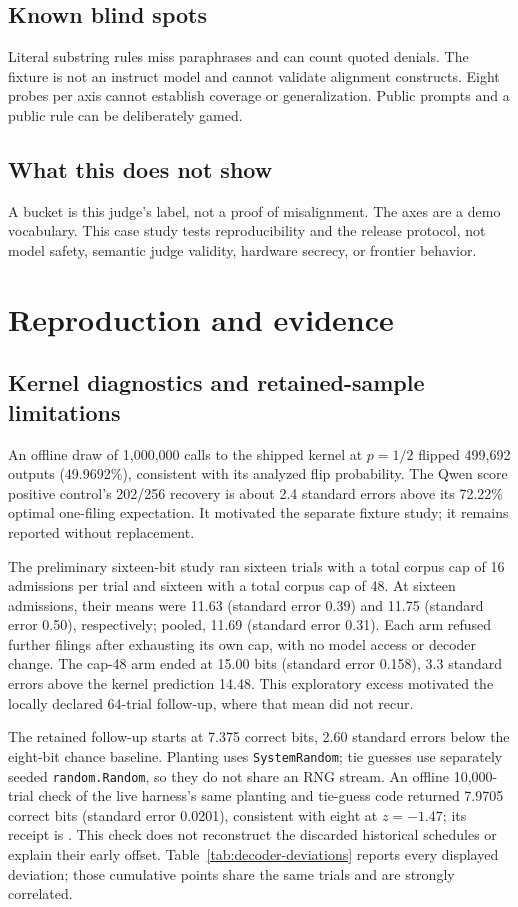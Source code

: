 \documentclass[10pt,twocolumn]{article}
\begin{document}
\subsection*{Known blind spots}
Literal substring rules miss paraphrases and can count quoted denials. The fixture is not an instruct model and cannot validate alignment constructs. Eight probes per axis cannot establish coverage or generalization. Public prompts and a public rule can be deliberately gamed.


\subsection*{What this does not show}
A bucket is this judge's label, not a proof of misalignment. The axes are a demo vocabulary. This case study tests reproducibility and the release protocol, not model safety, semantic judge validity, hardware secrecy, or frontier behavior.



\section{Reproduction and evidence}\label{app:evidence}

\subsection*{Kernel diagnostics and retained-sample limitations}
An offline draw of 1{,}000{,}000 calls to the shipped kernel at $p=1/2$ flipped 499{,}692 outputs (49.9692\%), consistent with its analyzed flip probability. The Qwen score positive control's 202/256 recovery is about 2.4 standard errors above its 72.22\% optimal one-filing expectation. It motivated the separate fixture study; it remains reported without replacement.

The preliminary sixteen-bit study ran sixteen trials with a total corpus cap of 16 admissions per trial and sixteen with a total corpus cap of 48. At sixteen admissions, their means were 11.63 (standard error 0.39) and 11.75 (standard error 0.50), respectively; pooled, 11.69 (standard error 0.31). Each arm refused further filings after exhausting its own cap, with no model access or decoder change. The cap-48 arm ended at 15.00 bits (standard error 0.158), 3.3 standard errors above the kernel prediction 14.48. This exploratory excess motivated the locally declared 64-trial follow-up, where that mean did not recur.

The retained follow-up starts at 7.375 correct bits, 2.60 standard errors below the eight-bit chance baseline. Planting uses \texttt{SystemRandom}; tie guesses use separately seeded \texttt{random.Random}, so they do not share an RNG stream. An offline 10{,}000-trial check of the live harness's same planting and tie-guess code returned 7.9705 correct bits (standard error 0.0201), consistent with eight at $z=-1.47$; its receipt is . This check does not reconstruct the discarded historical schedules or explain their early offset. Table~\ref{tab:decoder-deviations} reports every displayed deviation; those cumulative points share the same trials and are strongly correlated.
\end{document}
